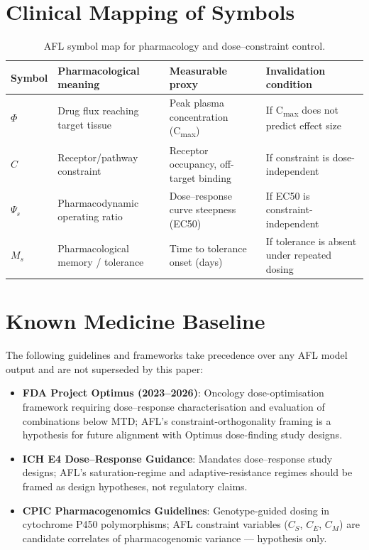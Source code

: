 \documentclass[11pt]{article}
\begin{document}



\section{Clinical Mapping of Symbols}

\begin{table}[h!]
\centering
\caption{AFL symbol map for pharmacology and dose--constraint control.}
\begin{tabular}{llll}
\toprule
\textbf{Symbol} & \textbf{Pharmacological meaning} & \textbf{Measurable proxy} & \textbf{Invalidation condition} \\
\midrule
$\Phi$ & Drug flux reaching target tissue & Peak plasma concentration (C\textsubscript{max}) & If C\textsubscript{max} does not predict effect size \\
$C$ & Receptor/pathway constraint & Receptor occupancy, off-target binding & If constraint is dose-independent \\
$\Psi_s$ & Pharmacodynamic operating ratio & Dose--response curve steepness (EC50) & If EC50 is constraint-independent \\
$M_s$ & Pharmacological memory / tolerance & Time to tolerance onset (days) & If tolerance is absent under repeated dosing \\
\bottomrule
\end{tabular}
\end{table}

\section{Known Medicine Baseline}

The following guidelines and frameworks take precedence over any AFL model output and are not superseded by this paper:
\begin{itemize}
  \item \textbf{FDA Project Optimus (2023--2026)}: Oncology dose-optimisation framework requiring dose--response characterisation and evaluation of combinations below MTD; AFL's constraint-orthogonality framing is a hypothesis for future alignment with Optimus dose-finding study designs.
  \item \textbf{ICH E4 Dose--Response Guidance}: Mandates dose--response study designs; AFL's saturation-regime and adaptive-resistance regimes should be framed as design hypotheses, not regulatory claims.
  \item \textbf{CPIC Pharmacogenomics Guidelines}: Genotype-guided dosing in cytochrome P450 polymorphisms; AFL constraint variables ($C_S$, $C_E$, $C_M$) are candidate correlates of pharmacogenomic variance — hypothesis only.
\end{itemize}
\end{document}
